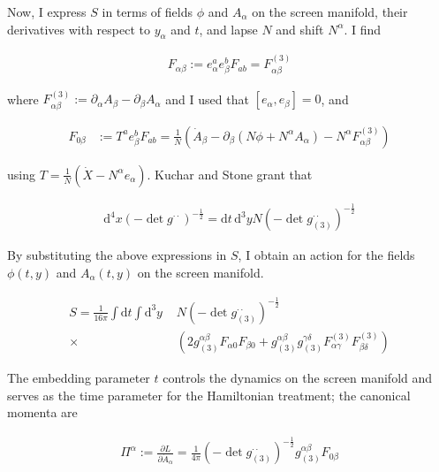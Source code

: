 \documentclass[11pt]{article}
\begin{document}
Now, I express $S$ in terms of fields $\phi$ and $A_{\alpha}$ on the screen manifold, their derivatives with respect to $y_\alpha$ and $t$, and lapse $N$ and shift $N^{\alpha}$. I find

\begin{align}
	F_{\alpha \beta} := e^a_{\alpha} e^b_{\beta} F_{a b} = F^{(3)}_{\alpha \beta}
\end{align}

where $F^{(3)}_{\alpha \beta} := \partial_{\alpha} A_{\beta} - \partial_{\beta} A_{\alpha}  $ and I used that $\left[ e_{\alpha}, e_{\beta}\right] = 0 $, and

\begin{align}
	F_{0 \beta} &:= T^a e^b_{\beta} F_{a b} = \frac{1}{N} \left( \dot{A}_{\beta} - \partial_{\beta} \left( N \phi +  N^{\alpha} A_{\alpha} \right) - N^{\alpha}  F^{(3)}_{\alpha \beta} \right)
\end{align}

using $ T = \frac{1}{N} \left( \dot{X} - N^\alpha e_{\alpha} \right)$. Kuchar  and Stone grant that 

\begin{align}
	\mathrm{d}^4 x \left( - \det{g^{\cdot \cdot}} \right)^{-\frac{1}{2}} = \mathrm{d}t \, \mathrm{d}^3 y N \left( - \det{g_{(3)}^{\cdot \cdot}} \right)^{-\frac{1}{2}}
\end{align}
 
By substituting the above expressions in $S$, I obtain an action for the fields $\phi (t, y) $ and $A_{\alpha} (t, y) $ on the screen manifold. 

\begin{align}
	S = \frac{1}{16 \pi} \int \mathrm{d}t \int \mathrm{d}^3 y \, \,
	&N \left( - \det{g_{(3)}^{\cdot \cdot}} \right)^{-\frac{1}{2}} \\ 
	\times 
	&\left(
	 2 g_{(3)}^{\alpha \beta} F_{\alpha 0 } F_{\beta 0 }  
	 + g_{(3)}^{\alpha \beta} g_{(3)}^{\gamma \delta } F^{(3)}_{\alpha \gamma}  F^{(3)}_{\beta \delta} 
	\right)
\end{align}

The embedding parameter $t$ controls the dynamics on the screen manifold and serves as the time parameter for the Hamiltonian treatment; the canonical momenta are 

\begin{align}
	\Pi^{\alpha} := \frac{\partial L}{\partial \dot{A}_{\alpha}} = \frac{1}{4\pi} \left( - \det{g_{(3)}^{\cdot \cdot}} \right)^{-\frac{1}{2}} 
	 g_{(3)}^{\alpha \beta} F_{0 \beta}
\end{align}
\end{document}
